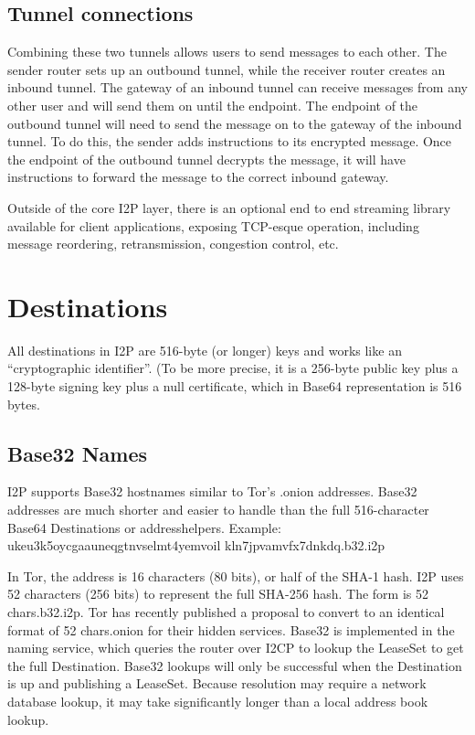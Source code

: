 \documentclass[a4paper,twocolumn,12pt]{article}
\begin{document}
\subsection{Tunnel connections}
Combining these two tunnels allows users to send messages to each other. The
sender router sets up an outbound tunnel, while the receiver router creates an
inbound tunnel. The gateway of an inbound tunnel can receive messages from any
other user and will send them on until the endpoint. The endpoint of the
outbound tunnel will need to send the message on to the gateway of the inbound
tunnel. To do this, the sender adds instructions to its encrypted message. Once
the endpoint of the outbound tunnel decrypts the message, it will have
instructions to forward the message to the correct inbound gateway.

Outside of the core I2P layer, there is an optional end to
end streaming library available for client applications, exposing TCP-esque operation,
including message reordering, retransmission, congestion control, etc.

\section{Destinations}

All destinations in I2P are 516-byte (or longer) keys and works like an ``cryptographic identifier''.
(To be more precise, it is a 256-byte public key plus a 128-byte signing
key plus a null certificate, which in Base64\cite{rfc4648} representation is 516 bytes.

\subsection{Base32 Names}

I2P supports Base32\cite{rfc4648} hostnames similar to Tor's\cite{tor-design} .onion
addresses. Base32 addresses are much shorter and easier to handle than the full
516-character Base64 Destinations or addresshelpers. Example:
ukeu3k5oycgaauneqgtnvselmt4yemvoil
kln7jpvamvfx7dnkdq.b32.i2p

In Tor\cite{tor-design}, the address is 16 characters (80 bits), or half of the
SHA-1 hash.  \cite{tor-hiddenservice} I2P uses 52 characters (256 bits) to
represent the full SHA-256 hash. The form is {52 chars}.b32.i2p.
Tor\cite{tor-design} has recently published a proposal to convert to an
identical format of {52 chars}.onion for their hidden services. Base32 is
implemented in the naming service, which queries the router over I2CP to lookup
the LeaseSet to get the full Destination. Base32 lookups will only be
successful when the Destination is up and publishing a LeaseSet. Because
resolution may require a network database lookup, it may take significantly
longer than a local address book lookup.
\end{document}
